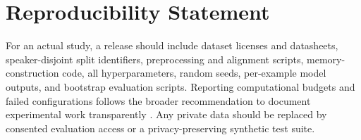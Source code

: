 \section{Reproducibility Statement}
\label{sec:reproducibility}

For an actual study, a release should include dataset licenses and datasheets,
speaker-disjoint split identifiers, preprocessing and alignment scripts,
memory-construction code, all hyperparameters, random seeds, per-example model
outputs, and bootstrap evaluation scripts. Reporting computational budgets and
failed configurations follows the broader recommendation to document
experimental work transparently \citep{dodge2019show}. Any private data should
be replaced by consented evaluation access or a privacy-preserving synthetic
test suite.

